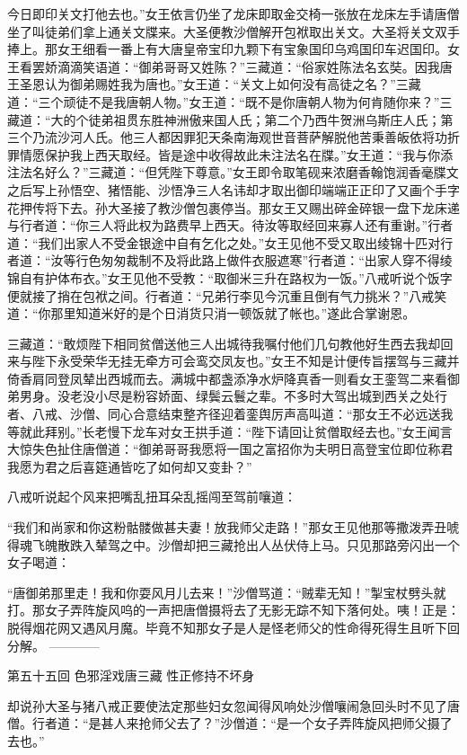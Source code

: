 \documentclass[12pt,UTF8]{ctexbook}
\begin{document}
今日即印关文打他去也。”女王依言仍坐了龙床即取金交椅一张放在龙床左手请唐僧坐了叫徒弟们拿上通关文牒来。大圣便教沙僧解开包袱取出关文。大圣将关文双手捧上。那女王细看一番上有大唐皇帝宝印九颗下有宝象国印乌鸡国印车迟国印。女王看罢娇滴滴笑语道：“御弟哥哥又姓陈？”三藏道：“俗家姓陈法名玄奘。因我唐王圣恩认为御弟赐姓我为唐也。”女王道：“关文上如何没有高徒之名？”三藏道：“三个顽徒不是我唐朝人物。”女王道：“既不是你唐朝人物为何肯随你来？”三藏道：“大的个徒弟祖贯东胜神洲傲来国人氏；第二个乃西牛贺洲乌斯庄人氏；第三个乃流沙河人氏。他三人都因罪犯天条南海观世音菩萨解脱他苦秉善皈依将功折罪情愿保护我上西天取经。皆是途中收得故此未注法名在牒。”女王道：“我与你添注法名好么？”三藏道：“但凭陛下尊意。”女王即令取笔砚来浓磨香翰饱润香毫牒文之后写上孙悟空、猪悟能、沙悟净三人名讳却才取出御印端端正正印了又画个手字花押传将下去。孙大圣接了教沙僧包裹停当。那女王又赐出碎金碎银一盘下龙床递与行者道：“你三人将此权为路费早上西天。待汝等取经回来寡人还有重谢。”行者道：“我们出家人不受金银途中自有乞化之处。”女王见他不受又取出绫锦十匹对行者道：“汝等行色匆匆裁制不及将此路上做件衣服遮寒”行者道：“出家人穿不得绫锦自有护体布衣。”女王见他不受教：“取御米三升在路权为一饭。”八戒听说个饭字便就接了捎在包袱之间。行者道：“兄弟行李见今沉重且倒有气力挑米？”八戒笑道：“你那里知道米好的是个日消货只消一顿饭就了帐也。”遂此合掌谢恩。

三藏道：“敢烦陛下相同贫僧送他三人出城待我嘱付他们几句教他好生西去我却回来与陛下永受荣华无挂无牵方可会鸾交凤友也。”女王不知是计便传旨摆驾与三藏并倚香肩同登凤辇出西城而去。满城中都盏添净水炉降真香一则看女王銮驾二来看御弟男身。没老没小尽是粉容娇面、绿鬓云鬟之辈。不多时大驾出城到西关之处行者、八戒、沙僧、同心合意结束整齐径迎着銮舆厉声高叫道：“那女王不必远送我等就此拜别。”长老慢下龙车对女王拱手道：“陛下请回让贫僧取经去也。”女王闻言大惊失色扯住唐僧道：“御弟哥哥我愿将一国之富招你为夫明日高登宝位即位称君我愿为君之后喜筵通皆吃了如何却又变卦？”

八戒听说起个风来把嘴乱扭耳朵乱摇闯至驾前嚷道：

“我们和尚家和你这粉骷髅做甚夫妻！放我师父走路！”那女王见他那等撒泼弄丑唬得魂飞魄散跌入辇驾之中。沙僧却把三藏抢出人丛伏侍上马。只见那路旁闪出一个女子喝道：

“唐御弟那里走！我和你耍风月儿去来！”沙僧骂道：“贼辈无知！”掣宝杖劈头就打。那女子弄阵旋风呜的一声把唐僧摄将去了无影无踪不知下落何处。咦！正是：脱得烟花网又遇风月魔。毕竟不知那女子是人是怪老师父的性命得死得生且听下回分解。
------------

第五十五回 色邪淫戏唐三藏 性正修持不坏身

却说孙大圣与猪八戒正要使法定那些妇女忽闻得风响处沙僧嚷闹急回头时不见了唐僧。行者道：“是甚人来抢师父去了？”沙僧道：“是一个女子弄阵旋风把师父摄了去也。”
\end{document}

